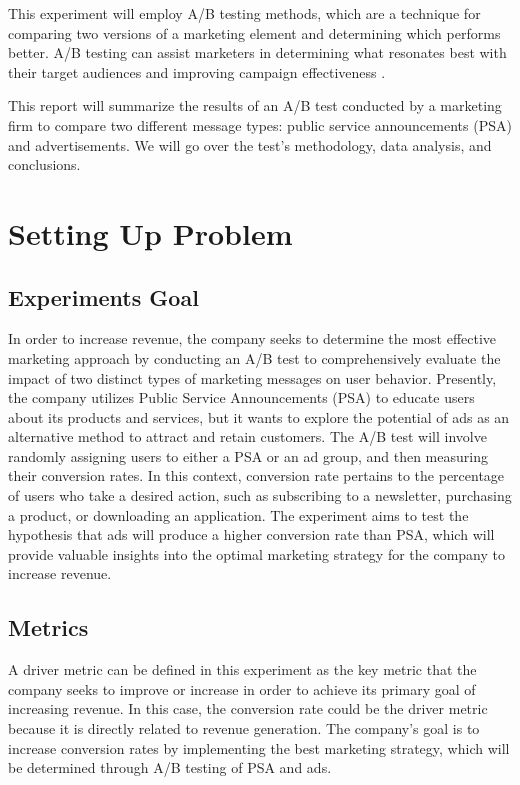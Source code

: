 \documentclass{article}
\begin{document}
This experiment will employ A/B testing methods, which are a technique for comparing two versions of a marketing element and determining which performs better. A/B testing can assist marketers in determining what resonates best with their target audiences and improving campaign effectiveness \cite{baldwin_2023_how}. 

This report will summarize the results of an A/B test conducted by a marketing firm to compare two different message types: public service announcements (PSA) and advertisements. We will go over the test's methodology, data analysis, and conclusions. 

\section{Setting Up Problem} 

\subsection*{Experiments Goal} 

In order to increase revenue, the company seeks to determine the most effective marketing approach by conducting an A/B test to comprehensively evaluate the impact of two distinct types of marketing messages on user behavior. Presently, the company utilizes Public Service Announcements (PSA) to educate users about its products and services, but it wants to explore the potential of ads as an alternative method to attract and retain customers. The A/B test will involve randomly assigning users to either a PSA or an ad group, and then measuring their conversion rates. In this context, conversion rate pertains to the percentage of users who take a desired action, such as subscribing to a newsletter, purchasing a product, or downloading an application. The experiment aims to test the hypothesis that ads will produce a higher conversion rate than PSA, which will provide valuable insights into the optimal marketing strategy for the company to increase revenue. 

\subsection*{Metrics} 

A driver metric can be defined in this experiment as the key metric that the company seeks to improve or increase in order to achieve its primary goal of increasing revenue. In this case, the conversion rate could be the driver metric because it is directly related to revenue generation. The company's goal is to increase conversion rates by implementing the best marketing strategy, which will be determined through A/B testing of PSA and ads. 
\end{document}
